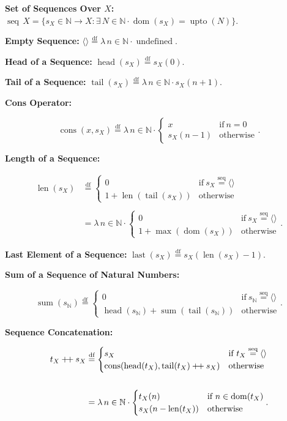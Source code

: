 \documentclass[12pt]{article}
\newcommand{\dfeq}{\stackrel{\text{df}}{=}}
\newcommand{\seqeq}{\stackrel{\text{seq}}{=}}
\newcommand{\pp}{\mathbin{\mbox{{+}\nolinebreak\hspace{-.15em}{+}}}}
\DeclareMathOperator{\jseq}{seq}
\DeclareMathOperator{\jdom}{dom}
\DeclareMathOperator{\jsum}{sum}
\DeclareMathOperator{\jupto}{upto}
\DeclareMathOperator{\jundefined}{undefined}
\DeclareMathOperator{\jcons}{cons}
\DeclareMathOperator{\jhead}{head}
\DeclareMathOperator{\jlast}{last}
\DeclareMathOperator{\jtail}{tail}
\DeclareMathOperator{\jlen}{len}
\theoremstyle{plain}
\begin{document}
\textbf{Set of Sequences Over $X$:} $\jseq\, X = \{s_X \in
\mathbb{N} \rightarrow X : \exists\, N \in \mathbb{N} \cdot
\jdom(s_X) = \jupto(N)\}$.

\textbf{Empty Sequence:} $\langle \rangle \dfeq \lambda\, n \in
\mathbb{N} \cdot \jundefined$.

\textbf{Head of a Sequence:} $\jhead(s_X) \dfeq s_X(0)$.

\textbf{Tail of a Sequence:} $\jtail(s_X) \dfeq \lambda\, n \in
\mathbb{N} \cdot s_X(n + 1)$.

\textbf{Cons Operator:}

$$
\jcons(x, s_X) \dfeq \lambda\, n \in \mathbb{N}
\cdot
\begin{cases}
    x          & \text{if}\ n = 0\\
    s_X(n - 1) & \text{otherwise}
\end{cases}.
$$

\textbf{Length of a Sequence:}

$$
\begin{aligned}
\jlen(s_X) &\dfeq
\begin{cases}
    0 & \text{if}\ s_X \seqeq \langle \rangle\\
    1 + \jlen(\jtail(s_X)) & \text{otherwise}
\end{cases}\\\\
&= \lambda\, n \in \mathbb{N} \cdot
\begin{cases}
    0 & \text{if}\ s_X \seqeq \langle \rangle\\
    1 + \max(\jdom(s_X)) & \text{otherwise}
\end{cases}.
\end{aligned}
$$

\textbf{Last Element of a Sequence:} $\jlast(s_X) \dfeq
s_X(\jlen(s_X) - 1)$.

\textbf{Sum of a Sequence of Natural Numbers:}

$$
\jsum(s_\mathbb{N}) \dfeq
\begin{cases}
    0 & \text{if}\ s_\mathbb{N} \seqeq \langle \rangle\\
    \jhead(s_\mathbb{N}) + \jsum(\jtail(s_\mathbb{N})) & \text{otherwise}
\end{cases}.
$$

\textbf{Sequence Concatenation:}

$$
\begin{aligned}
t_X \pp s_X &\dfeq
\begin{cases}
    s_X & \text{if}\ t_X \seqeq \langle \rangle\\
    \jcons(\jhead(t_X), \jtail(t_X) \pp s_X) & \text{otherwise}
\end{cases}\\\\
&= \lambda\, n \in \mathbb{N} \cdot
\begin{cases}
    t_X(n) & \text{if}\ n \in \jdom(t_X)\\
    s_X(n - \jlen(t_X)) & \text{otherwise}
\end{cases}.
\end{aligned}
$$
\end{document}
